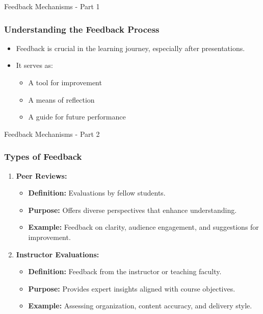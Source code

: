\documentclass[aspectratio=169]{beamer}
\begin{document}
\begin{frame}[fragile]{Feedback Mechanisms - Part 1}
    \frametitle{Understanding the Feedback Process}
    \begin{itemize}
        \item Feedback is crucial in the learning journey, especially after presentations.
        \item It serves as:
        \begin{itemize}
            \item A tool for improvement
            \item A means of reflection
            \item A guide for future performance
        \end{itemize}
    \end{itemize}
\end{frame}

\begin{frame}[fragile]{Feedback Mechanisms - Part 2}
    \frametitle{Types of Feedback}
    \begin{enumerate}
        \item \textbf{Peer Reviews:}
            \begin{itemize}
                \item \textbf{Definition:} Evaluations by fellow students.
                \item \textbf{Purpose:} Offers diverse perspectives that enhance understanding.
                \item \textbf{Example:} Feedback on clarity, audience engagement, and suggestions for improvement.
            \end{itemize}
        
        \item \textbf{Instructor Evaluations:}
            \begin{itemize}
                \item \textbf{Definition:} Feedback from the instructor or teaching faculty.
                \item \textbf{Purpose:} Provides expert insights aligned with course objectives.
                \item \textbf{Example:} Assessing organization, content accuracy, and delivery style.
            \end{itemize}
    \end{enumerate}
\end{frame}
\end{document}
